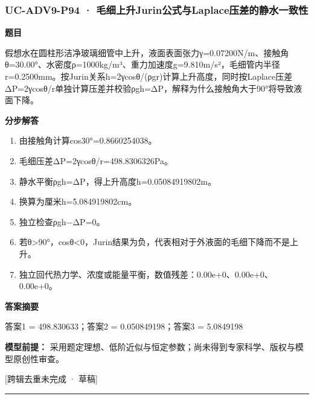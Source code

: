 \documentclass[UTF8,11pt,a4paper]{ctexart}
\begin{document}
\subsubsection*{UC-ADV9-P94 · 毛细上升Jurin公式与Laplace压差的静水一致性}
\noindent\textbf{题目}\par
假想水在圆柱形洁净玻璃细管中上升，液面表面张力γ=0.07200N/m、接触角θ=30.00°、水密度ρ=1000kg/m³、重力加速度g=9.810m/s²，毛细管内半径r=0.2500mm。按Jurin关系h=2γcosθ/(ρgr)计算上升高度，同时按Laplace压差ΔP=2γcosθ/r单独计算压差并校验ρgh=ΔP，解释为什么接触角大于90°将导致液面下降。\par
\medskip\noindent\textbf{分步解答}
\begin{enumerate}
\item 由接触角计算cos30°=0.8660254038。
\item 毛细压差ΔP=2γcosθ/r=498.8306326Pa。
\item 静水平衡ρgh=ΔP，得上升高度h=0.05084919802m。
\item 换算为厘米h=5.084919802cm。
\item 独立检查ρgh−ΔP=0。
\item 若θ>90°，cosθ<0，Jurin结果为负，代表相对于外液面的毛细下降而不是上升。
\item 独立回代热力学、浓度或能量平衡，数值残差：0.00e+0、0.00e+0、0.00e+0。
\end{enumerate}
\noindent\textbf{答案摘要}\par
答案1 = 498.830633；答案2 = 0.050849198；答案3 = 5.0849198\par
\noindent\textbf{模型前提：}
采用题定理想、低阶近似与恒定参数；尚未得到专家科学、版权与模型原创性审查。\par
\noindent\textcolor{red!65!black}{[跨辑去重未完成 · 草稿]} \par
\medskip\hrule\medskip
{}
\end{document}
